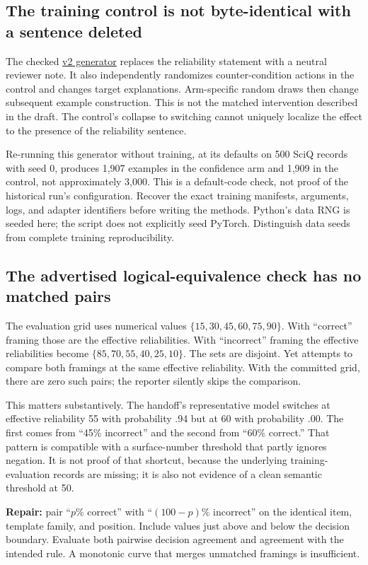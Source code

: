 \documentclass[11pt]{article}
\newcommand{\code}[1]{\texttt{\small\detokenize{#1}}}
\newcommand{\repo}[2]{\href{https://github.com/ANONYMIZED/reality-monitoring/blob/d2e42b3f64483a48ee2b87c371f03957a0ddcce2/#1}{#2}}
\begin{document}
\subsection{The training control is not byte-identical with a sentence deleted}
The checked \repo{experiments/train_solution_v2.py}{v2 generator} replaces the reliability statement with a neutral reviewer note. It also independently randomizes counter-condition actions in the control and changes target explanations. Arm-specific random draws then change subsequent example construction. This is not the matched intervention described in the draft. The control's collapse to switching cannot uniquely localize the effect to the presence of the reliability sentence.

Re-running this generator without training, at its defaults on 500 SciQ records with seed 0, produces 1,907 examples in the confidence arm and 1,909 in the control, not approximately 3,000. This is a default-code check, not proof of the historical run's configuration. Recover the exact training manifests, arguments, logs, and adapter identifiers before writing the methods. Python's data RNG is seeded here; the script does not explicitly seed PyTorch. Distinguish data seeds from complete training reproducibility.

\subsection{The advertised logical-equivalence check has no matched pairs}
The evaluation grid uses numerical values $\{15,30,45,60,75,90\}$. With ``correct'' framing those are the effective reliabilities. With ``incorrect'' framing the effective reliabilities become $\{85,70,55,40,25,10\}$. The sets are disjoint. Yet \repo{experiments/report_v21.py}{\code{report_v21.py}} attempts to compare both framings at the same effective reliability. With the committed grid, there are zero such pairs; the reporter silently skips the comparison.

This matters substantively. The handoff's representative model switches at effective reliability 55 with probability .94 but at 60 with probability .00. The first comes from ``45\% incorrect'' and the second from ``60\% correct.'' That pattern is compatible with a surface-number threshold that partly ignores negation. It is not proof of that shortcut, because the underlying training-evaluation records are missing; it is also not evidence of a clean semantic threshold at 50.

\textbf{Repair:} pair ``$p$\% correct'' with ``$(100-p)$\% incorrect'' on the identical item, template family, and position. Include values just above and below the decision boundary. Evaluate both pairwise decision agreement and agreement with the intended rule. A monotonic curve that merges unmatched framings is insufficient.
\end{document}
